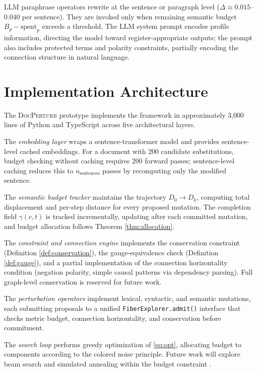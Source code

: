\documentclass[12pt, a4paper]{article}
\theoremstyle{plain}
\theoremstyle{definition}
\theoremstyle{remark}
\begin{document}
LLM paraphrase operators rewrite at the sentence or paragraph level
($\Delta \approx 0.015$--$0.040$ per sentence).  They are invoked only when
remaining semantic budget $B_p - \mathrm{spent}_p$ exceeds a threshold.  The
LLM system prompt encodes profile information, directing the model toward
register-appropriate outputs; the prompt also includes protected terms and
polarity constraints, partially encoding the connection structure in natural
language.


\section{Implementation Architecture}
\label{sec:implementation}

The \textsc{DocPerturb} prototype implements the framework in approximately
3,000 lines of Python and TypeScript across five architectural layers.

The \emph{embedding layer} wraps a sentence-transformer model
\cite{reimers2019sentencebert} and provides sentence-level cached embeddings.
For a document with 200 candidate substitutions, budget checking without
caching requires 200 forward passes; sentence-level caching reduces this to
$n_{\mathrm{sentences}}$ passes by recomputing only the modified sentence.

The \emph{semantic budget tracker} maintains the trajectory $D_0 \to D_k$,
computing total displacement and per-step distance for every proposed mutation.
The completion field $\gamma(c, t)$ is tracked incrementally, updating after
each committed mutation, and budget allocation follows Theorem \ref{thm:allocation}.

The \emph{constraint and connection engine} implements the conservation
constraint (Definition \ref{def:conservation}), the gauge-equivalence check
(Definition \ref{def:gauge}), and a partial implementation of the connection
horizontality condition (negation polarity, simple causal patterns via
dependency parsing).  Full graph-level conservation is reserved for future work.

The \emph{perturbation operators} implement lexical, syntactic, and semantic
mutations, each submitting proposals to a unified \texttt{FiberExplorer.admit()}
interface that checks metric budget, connection horizontality, and conservation
before commitment.

The \emph{search loop} performs greedy optimization of \eqref{eq:opt},
allocating budget to components according to the colored noise principle.
Future work will explore beam search and simulated annealing within the budget
constraint \cite{bertsekas1995dynamic}.
\end{document}
